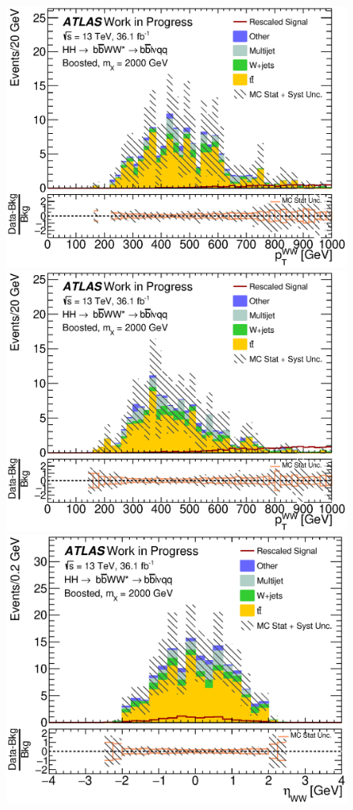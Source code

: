 \begin{figure}[h]
\begin{center}
\includegraphics[scale=0.33]{figures/kinplots/C_2tag_SR_elec_presel_met50_WWPt}
\includegraphics[scale=0.33]{figures/kinplots/C_2tag_SR_muon_presel_met50_WWPt}\\
\includegraphics[scale=0.33]{figures/kinplots/C_2tag_SR_elec_presel_met50_WWEta}

\end{center}
\end{figure}
